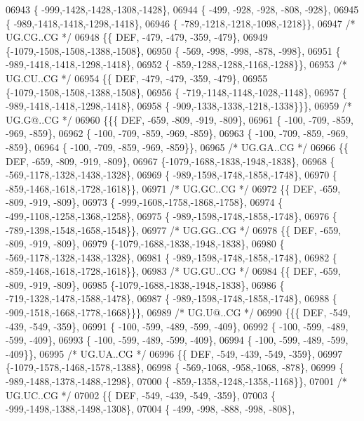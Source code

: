 \begin{DoxyCode}
06943 \{ -999,-1428,-1428,-1308,-1428\},
06944 \{ -499, -928, -928, -808, -928\},
06945 \{ -989,-1418,-1418,-1298,-1418\},
06946 \{ -789,-1218,-1218,-1098,-1218\}\},
06947 \textcolor{comment}{/* UG.CG..CG */}
06948 \{\{  DEF, -479, -479, -359, -479\},
06949 \{-1079,-1508,-1508,-1388,-1508\},
06950 \{ -569, -998, -998, -878, -998\},
06951 \{ -989,-1418,-1418,-1298,-1418\},
06952 \{ -859,-1288,-1288,-1168,-1288\}\},
06953 \textcolor{comment}{/* UG.CU..CG */}
06954 \{\{  DEF, -479, -479, -359, -479\},
06955 \{-1079,-1508,-1508,-1388,-1508\},
06956 \{ -719,-1148,-1148,-1028,-1148\},
06957 \{ -989,-1418,-1418,-1298,-1418\},
06958 \{ -909,-1338,-1338,-1218,-1338\}\}\},
06959 \textcolor{comment}{/* UG.G@..CG */}
06960 \{\{\{  DEF, -659, -809, -919, -809\},
06961 \{ -100, -709, -859, -969, -859\},
06962 \{ -100, -709, -859, -969, -859\},
06963 \{ -100, -709, -859, -969, -859\},
06964 \{ -100, -709, -859, -969, -859\}\},
06965 \textcolor{comment}{/* UG.GA..CG */}
06966 \{\{  DEF, -659, -809, -919, -809\},
06967 \{-1079,-1688,-1838,-1948,-1838\},
06968 \{ -569,-1178,-1328,-1438,-1328\},
06969 \{ -989,-1598,-1748,-1858,-1748\},
06970 \{ -859,-1468,-1618,-1728,-1618\}\},
06971 \textcolor{comment}{/* UG.GC..CG */}
06972 \{\{  DEF, -659, -809, -919, -809\},
06973 \{ -999,-1608,-1758,-1868,-1758\},
06974 \{ -499,-1108,-1258,-1368,-1258\},
06975 \{ -989,-1598,-1748,-1858,-1748\},
06976 \{ -789,-1398,-1548,-1658,-1548\}\},
06977 \textcolor{comment}{/* UG.GG..CG */}
06978 \{\{  DEF, -659, -809, -919, -809\},
06979 \{-1079,-1688,-1838,-1948,-1838\},
06980 \{ -569,-1178,-1328,-1438,-1328\},
06981 \{ -989,-1598,-1748,-1858,-1748\},
06982 \{ -859,-1468,-1618,-1728,-1618\}\},
06983 \textcolor{comment}{/* UG.GU..CG */}
06984 \{\{  DEF, -659, -809, -919, -809\},
06985 \{-1079,-1688,-1838,-1948,-1838\},
06986 \{ -719,-1328,-1478,-1588,-1478\},
06987 \{ -989,-1598,-1748,-1858,-1748\},
06988 \{ -909,-1518,-1668,-1778,-1668\}\}\},
06989 \textcolor{comment}{/* UG.U@..CG */}
06990 \{\{\{  DEF, -549, -439, -549, -359\},
06991 \{ -100, -599, -489, -599, -409\},
06992 \{ -100, -599, -489, -599, -409\},
06993 \{ -100, -599, -489, -599, -409\},
06994 \{ -100, -599, -489, -599, -409\}\},
06995 \textcolor{comment}{/* UG.UA..CG */}
06996 \{\{  DEF, -549, -439, -549, -359\},
06997 \{-1079,-1578,-1468,-1578,-1388\},
06998 \{ -569,-1068, -958,-1068, -878\},
06999 \{ -989,-1488,-1378,-1488,-1298\},
07000 \{ -859,-1358,-1248,-1358,-1168\}\},
07001 \textcolor{comment}{/* UG.UC..CG */}
07002 \{\{  DEF, -549, -439, -549, -359\},
07003 \{ -999,-1498,-1388,-1498,-1308\},
07004 \{ -499, -998, -888, -998, -808\},

\end{DoxyCode}
